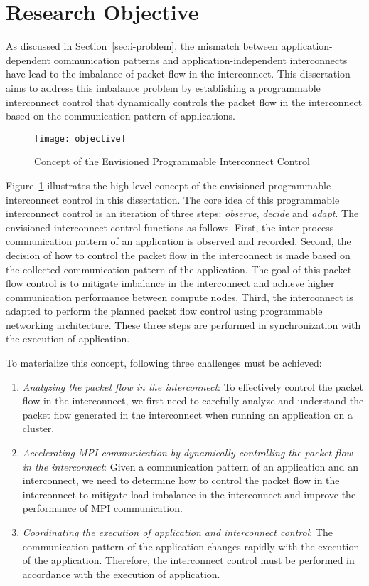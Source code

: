 \clearpage

\section{Research Objective}

As discussed in Section~\ref{sec:i-problem}, the mismatch between
application-dependent communication patterns and application-independent
interconnects have lead to the imbalance of packet flow in the interconnect.
This dissertation aims to address this imbalance problem by establishing a
programmable interconnect control that dynamically controls the packet flow in
the interconnect based on the communication pattern of applications.

\begin{figure}
    \centering
    \texttt{[image: objective]}
    \caption{Concept of the Envisioned Programmable Interconnect Control}%
    \label{fig:objective}
\end{figure}

Figure~\ref{fig:objective} illustrates the high-level concept of the
envisioned programmable interconnect control in this dissertation. The core
idea of this programmable interconnect control is an iteration of three steps:
\emph{observe}, \emph{decide} and \emph{adapt}. The envisioned interconnect
control functions as follows. First, the inter-process communication pattern
of an application is observed and recorded. Second, the decision of how to
control the packet flow in the interconnect is made based on the collected
communication pattern of the application. The goal of this packet flow control
is to mitigate imbalance in the interconnect and achieve higher communication
performance between compute nodes. Third, the interconnect is adapted to
perform the planned packet flow control using programmable networking
architecture. These three steps are performed in synchronization with the
execution of application.

To materialize this concept, following three challenges must be achieved:

\begin{enumerate}
\item \emph{Analyzing the packet flow in the interconnect}:
    To effectively control the packet flow in the interconnect, we first need
    to carefully analyze and understand the packet flow generated in the
    interconnect when running an application on a cluster.
\item \emph{Accelerating MPI communication by dynamically controlling the
    packet flow in the interconnect}:
    Given a communication pattern of an application and an interconnect,
    we need to determine how to control the packet flow in the interconnect to
    mitigate load imbalance in the interconnect and improve the performance of
    MPI communication.
\item \emph{Coordinating the execution of application and interconnect control}:
    The communication pattern of the application changes rapidly with the
    execution of the application. Therefore, the interconnect control must
    be performed in accordance with the execution of application.
\end{enumerate}

